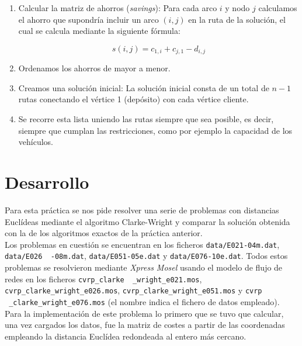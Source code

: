 \documentclass[a4paper,11pt]{article}
\begin{document}
\begin{enumerate}
\item Calcular la matriz de ahorros (\textit{savings}): Para cada arco ${i}$ y nodo ${j}$ calculamos el ahorro que supondría incluir un arco ${(i,j)}$ en la ruta de la solución, el cual se calcula mediante la siguiente fórmula:

\begin{equation}
\label{saving}
s(i,j) = c_{1,i} + c_{j,1} - d_{i,j}
\end{equation}

\item Ordenamos los ahorros de mayor a menor.

\item Creamos una solución inicial: La solución inicial consta de un total de ${n-1}$ rutas conectando el vértice 1 (depósito) con cada vértice cliente.

\item Se recorre esta lista uniendo las rutas siempre que sea posible, es decir, siempre que cumplan las restricciones, como por ejemplo la capacidad de los vehículos.
\end{enumerate}

\section{Desarrollo}
Para esta práctica se nos pide resolver una serie de problemas con distancias Euclídeas mediante el algoritmo Clarke-Wright y comparar la solución obtenida con la de los algoritmos exactos de la práctica anterior.\\

Los problemas en cuestión se encuentran en los ficheros \texttt{data/E021-04m.dat}, \texttt{data/E026 \ -08m.dat}, \texttt{data/E051-05e.dat} y \texttt{data/E076-10e.dat}. Todos estos problemas se resolvieron mediante \textit{Xpress Mosel} usando el modelo de flujo de redes en los ficheros \texttt{cvrp\_clarke \ \_wright\_e021.mos}, \texttt{cvrp\_clarke\_wright\_e026.mos}, \texttt{cvrp\_clarke\_wright\_e051.mos} y \texttt{cvrp \ \_clarke\_wright\_e076.mos} (el nombre indica el fichero de datos empleado).\\

Para la implementación de este problema lo primero que se tuvo que calcular, una vez cargados los datos, fue la matriz de costes a partir de las coordenadas empleando la distancia Euclídea redondeada al entero más cercano.\\
\end{document}
